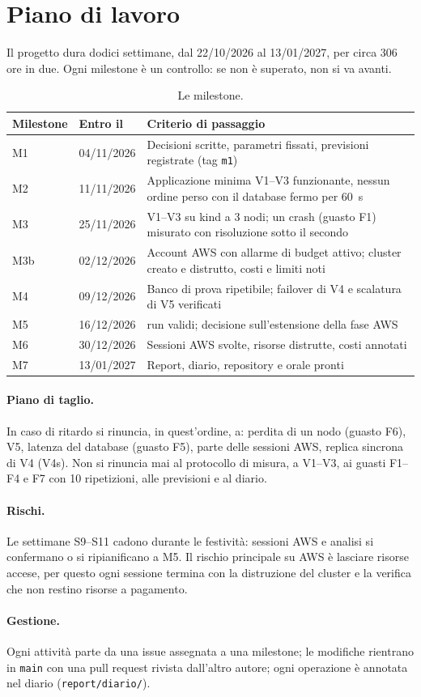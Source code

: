 \section{Piano di lavoro}
\label{s:piano}

Il progetto dura dodici settimane, dal 22/10/2026 al 13/01/2027, per circa 306 ore in due. Ogni milestone è un controllo: se non è superato, non si va avanti.

\begin{table}[H]
\centering
\caption{Le milestone.}
\label{tab:milestone}
\begin{tabularx}{\linewidth}{@{}llL@{}}
\toprule
\textbf{Milestone} & \textbf{Entro il} & \textbf{Criterio di passaggio} \\
\midrule
M1 & 04/11/2026 & Decisioni scritte, parametri fissati, previsioni registrate (tag \texttt{m1}) \\
M2 & 11/11/2026 & Applicazione minima V1--V3 funzionante, nessun ordine perso con il database fermo per 60~s \\
M3 & 25/11/2026 & V1--V3 su kind a 3 nodi; un crash (guasto F1) misurato con risoluzione sotto il secondo \\
M3b & 02/12/2026 & Account AWS con allarme di budget attivo; cluster creato e distrutto, costi e limiti noti \\
M4 & 09/12/2026 & Banco di prova ripetibile; failover di V4 e scalatura di V5 verificati \\
M5 & 16/12/2026 &  run validi; decisione sull'estensione della fase AWS \\
M6 & 30/12/2026 & Sessioni AWS svolte, risorse distrutte, costi annotati \\
M7 & 13/01/2027 & Report, diario, repository e orale pronti \\
\bottomrule
\end{tabularx}
\end{table}

\paragraph{Piano di taglio.} In caso di ritardo si rinuncia, in quest'ordine, a: perdita di un nodo (guasto F6), V5, latenza del database (guasto F5), parte delle sessioni AWS, replica sincrona di V4 (V4s). Non si rinuncia mai al protocollo di misura, a V1--V3, ai guasti F1--F4 e F7 con 10 ripetizioni, alle previsioni e al diario.

\paragraph{Rischi.} Le settimane S9--S11 cadono durante le festività: sessioni AWS e analisi si confermano o si ripianificano a M5. Il rischio principale su AWS è lasciare risorse accese, per questo ogni sessione termina con la distruzione del cluster e la verifica che non restino risorse a pagamento.

\paragraph{Gestione.} Ogni attività parte da una issue assegnata a una milestone; le modifiche rientrano in \texttt{main} con una pull request rivista dall'altro autore; ogni operazione è annotata nel diario (\texttt{report/diario/}).
